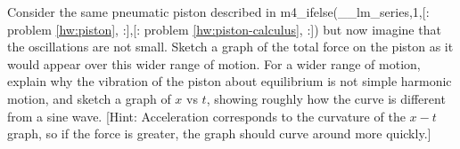 Consider the same pneumatic piston described in
m4_ifelse(__lm_series,1,[:%
problem \ref{hw:piston},
:],[:%
problem \ref{hw:piston-calculus},
:])%
but now imagine that the oscillations are
not small. Sketch a graph of the total force on the piston
as it would appear over this wider range of motion. For a
wider range of motion, explain why the vibration of the
piston about equilibrium is not simple harmonic motion, and
sketch a graph of $x$ vs $t$, showing roughly how the curve
is different from a sine wave. [Hint: Acceleration
corresponds to the curvature of the $x-t$ graph, so if the
force is greater, the graph should curve around more quickly.]
